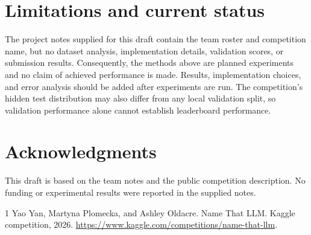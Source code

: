 \documentclass{article}
\begin{document}
\section{Limitations and current status}
The project notes supplied for this draft contain the team roster and competition name, but no dataset analysis, implementation details, validation scores, or submission results. Consequently, the methods above are planned experiments and no claim of achieved performance is made. Results, implementation choices, and error analysis should be added after experiments are run. The competition's hidden test distribution may also differ from any local validation split, so validation performance alone cannot establish leaderboard performance.

\section*{Acknowledgments}
This draft is based on the team notes and the public competition description. No funding or experimental results were reported in the supplied notes.

\begin{thebibliography}{1}
\small
{}
Yao Yan, Martyna Plomecka, and Ashley Oldacre.
\newblock Name That LLM.
\newblock Kaggle competition, 2026.
\newblock \url{https://www.kaggle.com/competitions/name-that-llm}.
\end{thebibliography}
\end{document}
